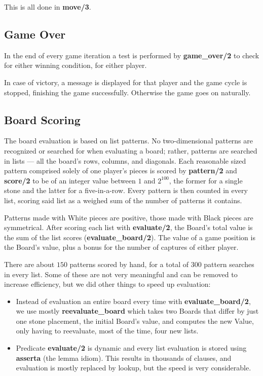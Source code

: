 \documentclass[12pt,a4paper,notitlepage]{article}
\begin{document}
This is all done in \textbf{move/3}.

\subsection{Game Over}
\label{subsec:gameover}

In the end of every game iteration a test is performed by \textbf{game\_over/2} to check for either winning condition, for either player.

In case of victory, a message is displayed for that player and the game cycle is stopped, finishing the game successfully. Otherwise the game goes on naturally.

\subsection{Board Scoring}
\label{subsec:boardscoring}

The board evaluation is based on list patterns. No two-dimensional patterns are recognized or searched for when evaluating a board; rather, patterns are searched in lists --- all the board's rows, columns, and diagonals. Each reasonable sized pattern comprised solely of one player's pieces is scored by \textbf{pattern/2} and \textbf{score/2} to be of an integer value between $1$ and $2^{100}$, the former for a single stone and the latter for a five-in-a-row. Every pattern is then counted in every list, scoring said list as a weighed sum of the number of patterns it contains.

Patterns made with White pieces are positive, those made with Black pieces are symmetrical. After scoring each list with \textbf{evaluate/2}, the Board's total value is the sum of the list scores (\textbf{evaluate\_board/2}). The value of a game position is the Board's value, plus a bonus for the number of captures of either player.

There are about $150$ patterns scored by hand, for a total of $300$ pattern searches in every list. Some of these are not very meaningful and can be removed to increase efficiency, but we did other things to speed up evaluation:

\begin{itemize}
	\item Instead of evaluation an entire board every time with \textbf{evaluate\_board/2}, we use mostly \textbf{reevaluate\_board} which takes two Boards that differ by just one stone placement, the initial Board's value, and computes the new Value, only having to reevaluate, most of the time, four new lists.
	\item Predicate \textbf{evaluate/2} is dynamic and every list evaluation
	is stored using \textbf{asserta} (the lemma idiom). This results in thousands of clauses, and evaluation is mostly replaced by lookup, but the speed is very considerable.
\end{itemize}
\end{document}
